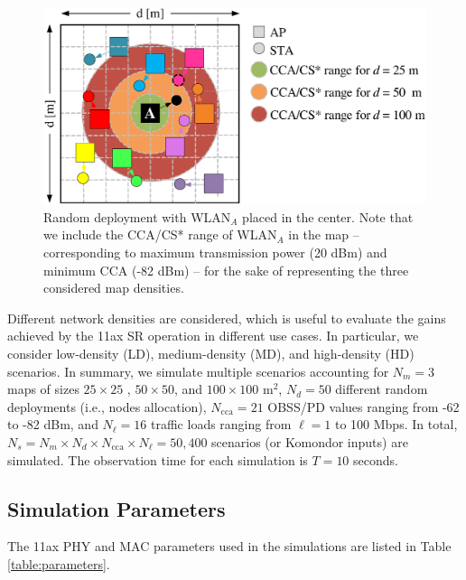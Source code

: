 \documentclass[conference]{IEEEtran}
\begin{document}
	\begin{figure}[ht!]
		\centering
		\includegraphics[width=\columnwidth]{map_central}
		\caption{Random deployment with WLAN$_A$ placed in the center. Note that we include the CCA/CS* range of WLAN$_A$ in the map -- corresponding to maximum transmission power (20 dBm) and minimum CCA (-82 dBm) -- for the sake of representing the three considered map densities.}
		\label{fig:random_scenario}
	\end{figure}
	
	Different network densities are considered, which is useful to evaluate the gains achieved by the 11ax SR operation in different use cases. In particular, we consider low-density (LD), medium-density (MD), and high-density (HD) scenarios. In summary, we simulate multiple scenarios accounting for $N_m = 3$ maps of sizes $25 \times 25$ , $50 \times 50$, and $100 \times 100$ m$^2$, $N_d = 50$ different random deployments (i.e., nodes allocation), $N_\text{cca} = 21$ OBSS/PD values ranging from -62 to -82 dBm, and $N_\ell = 16$ traffic loads ranging from $\ell = 1$ to 100 Mbps. In total, $N_s =  N_m \times N_d \times N_\text{cca} \times N_\ell = 50,400$ scenarios (or Komondor inputs) are simulated. The observation time for each simulation is $T = 10$ seconds.
	
	\subsection{Simulation Parameters}
	
	The 11ax PHY and MAC parameters used in the simulations are listed in Table \ref{table:parameters}.
	
\end{document}
